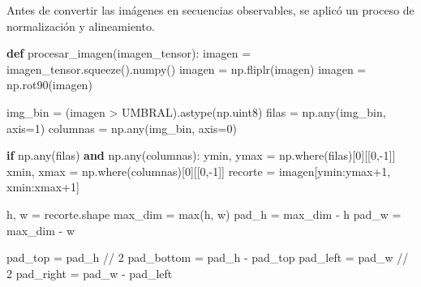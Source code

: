 \documentclass[
  spanish,
  us-letterpaper,
  DIV=11,
  numbers=noendperiod]{scrreprt}
\newenvironment{Shaded}{\begin{snugshade}}{\end{snugshade}}
\newcommand{\BuiltInTok}[1]{\textcolor[rgb]{0.00,0.23,0.31}{#1}}
\newcommand{\ControlFlowTok}[1]{\textcolor[rgb]{0.00,0.23,0.31}{\textbf{#1}}}
\newcommand{\DecValTok}[1]{\textcolor[rgb]{0.68,0.00,0.00}{#1}}
\newcommand{\KeywordTok}[1]{\textcolor[rgb]{0.00,0.23,0.31}{\textbf{#1}}}
\newcommand{\NormalTok}[1]{\textcolor[rgb]{0.00,0.23,0.31}{#1}}
\newcommand{\OperatorTok}[1]{\textcolor[rgb]{0.37,0.37,0.37}{#1}}
\begin{document}
Antes de convertir las imágenes en secuencias observables, se aplicó un
proceso de normalización y alineamiento.

\begin{Shaded}
\begin{Highlighting}[]
\KeywordTok{def}\NormalTok{ procesar\_imagen(imagen\_tensor):}
\NormalTok{    imagen }\OperatorTok{=}\NormalTok{ imagen\_tensor.squeeze().numpy()}
\NormalTok{    imagen }\OperatorTok{=}\NormalTok{ np.fliplr(imagen)}
\NormalTok{    imagen }\OperatorTok{=}\NormalTok{ np.rot90(imagen)}

\NormalTok{    img\_bin }\OperatorTok{=}\NormalTok{ (imagen }\OperatorTok{\textgreater{}}\NormalTok{ UMBRAL).astype(np.uint8)}
\NormalTok{    filas }\OperatorTok{=}\NormalTok{ np.}\BuiltInTok{any}\NormalTok{(img\_bin, axis}\OperatorTok{=}\DecValTok{1}\NormalTok{)}
\NormalTok{    columnas }\OperatorTok{=}\NormalTok{ np.}\BuiltInTok{any}\NormalTok{(img\_bin, axis}\OperatorTok{=}\DecValTok{0}\NormalTok{)}

    \ControlFlowTok{if}\NormalTok{ np.}\BuiltInTok{any}\NormalTok{(filas) }\KeywordTok{and}\NormalTok{ np.}\BuiltInTok{any}\NormalTok{(columnas):}
\NormalTok{        ymin, ymax }\OperatorTok{=}\NormalTok{ np.where(filas)[}\DecValTok{0}\NormalTok{][[}\DecValTok{0}\NormalTok{,}\OperatorTok{{-}}\DecValTok{1}\NormalTok{]]}
\NormalTok{        xmin, xmax }\OperatorTok{=}\NormalTok{ np.where(columnas)[}\DecValTok{0}\NormalTok{][[}\DecValTok{0}\NormalTok{,}\OperatorTok{{-}}\DecValTok{1}\NormalTok{]]}
\NormalTok{        recorte }\OperatorTok{=}\NormalTok{ imagen[ymin:ymax}\OperatorTok{+}\DecValTok{1}\NormalTok{, xmin:xmax}\OperatorTok{+}\DecValTok{1}\NormalTok{]}

\NormalTok{        h, w }\OperatorTok{=}\NormalTok{ recorte.shape}
\NormalTok{        max\_dim }\OperatorTok{=} \BuiltInTok{max}\NormalTok{(h, w)}
\NormalTok{        pad\_h }\OperatorTok{=}\NormalTok{ max\_dim }\OperatorTok{{-}}\NormalTok{ h}
\NormalTok{        pad\_w }\OperatorTok{=}\NormalTok{ max\_dim }\OperatorTok{{-}}\NormalTok{ w}

\NormalTok{        pad\_top }\OperatorTok{=}\NormalTok{ pad\_h }\OperatorTok{//} \DecValTok{2}
\NormalTok{        pad\_bottom }\OperatorTok{=}\NormalTok{ pad\_h }\OperatorTok{{-}}\NormalTok{ pad\_top}
\NormalTok{        pad\_left }\OperatorTok{=}\NormalTok{ pad\_w }\OperatorTok{//} \DecValTok{2}
\NormalTok{        pad\_right }\OperatorTok{=}\NormalTok{ pad\_w }\OperatorTok{{-}}\NormalTok{ pad\_left}


\end{Highlighting}
\end{Shaded}
\end{document}
